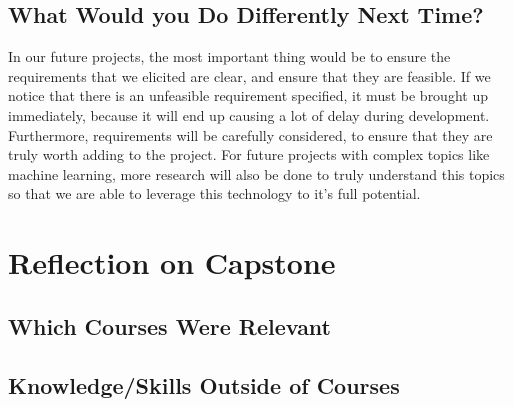 \documentclass{article}
\begin{document}
\subsection{What Would you Do Differently Next Time?}

In our future projects, the most important thing would be to ensure the
requirements that we elicited are clear, and ensure that they are feasible. If
we notice that there is an unfeasible requirement specified, it must be brought
up immediately, because it will end up causing a lot of delay during
development. Furthermore, requirements will be carefully considered, to ensure
that they are truly worth adding to the project. For future projects with
complex topics like machine learning, more research will also be done to truly
understand this topics so that we are able to leverage this technology to it's
full potential.

\section{Reflection on Capstone}


\subsection{Which Courses Were Relevant}


\subsection{Knowledge/Skills Outside of Courses}

\end{document}
